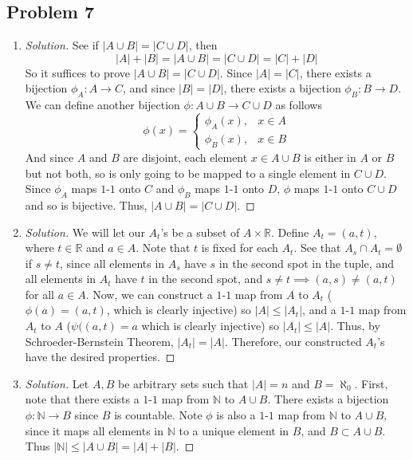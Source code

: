 \documentclass{article}
\newcommand{\N}{{\mathbb N}}
\newcommand{\R}{{\mathbb R}}
\begin{document}
\subsection*{Problem 7}
\begin{enumerate}
\item \begin{proof}[Solution]\let\qed\relax
	See if $\lvert A \cup B\rvert = \lvert C \cup D \rvert$, then
	\[
		\lvert A \rvert + \lvert B \rvert
		= \lvert A \cup B\rvert
		= \lvert C \cup D\rvert
		= \lvert C \rvert + \lvert D \rvert
	\]
	So it suffices to prove $\lvert A \cup B\rvert = \lvert C \cup D \rvert$.
	Since $|A| = |C|$, there exists a bijection $\phi_A \colon A  \to C$,
	and since $|B| = |D|$, there exists a bijection $\phi_B \colon B \to D$.
	We can define another bijection $\phi \colon A \cup B \to C \cup D$ as follows
	\[
		\phi(x) = \begin{cases} \phi_A(x), & x\in A\\ \phi_B(x), & x\in B\end{cases}
	\]
	And since $A$ and $B$ are disjoint, each element $x \in A \cup B$
	is either in $A$ or $B$ but not both,
	so is only going to be mapped to a single element in $C \cup D$.
	Since $\phi_A$ maps $1$-$1$ onto $C$ and $\phi_B$ maps $1$-$1$ onto $D$,
	$\phi$ maps $1$-$1$ onto $C \cup D$ and so is bijective.
	Thus, $\lvert A \cup B\rvert = \lvert C \cup D \rvert$.
\end{proof}
\item \begin{proof}[Solution]\let\qed\relax
	We will let our $A_t$'s be a subset of $A \times \R$.
	Define $A_t = (a, t)$, where $t\in\R$ and $a \in A$.
	Note that $t$ is fixed for each $A_t$.
	See that $A_s \cap A_t = \emptyset$ if $s \neq t$,
	since all elements in $A_s$ have $s$ in the second spot in the tuple,
	and all elements in $A_t$ have $t$ in the second spot,
	and $s \neq t \implies (a,s) \neq (a,t)$ for all $a \in A$.
	Now, we can construct a $1$-$1$ map from $A$ to $A_t$
	($\phi(a) = (a,t)$, which is clearly injective)
	so $|A| \leq |A_t|$,
	and a $1$-$1$ map from $A_t$ to $A$
	($\psi((a,t) = a$ which is clearly injective)
	so $|A_t| \leq |A|$.
	Thus, by Schroeder-Bernstein Theorem, $|A_t| = |A|$.
	Therefore, our constructed $A_t$'s have the desired properties.
\end{proof}
\item \begin{proof}[Solution]\let\qed\relax
	Let $A,B$ be arbitrary sets such that
	$|A| = n$ and $B = \aleph_0$.
	First, note that there exists a $1$-$1$ map from $\N$ to $A \cup B$.
	There exists a bijection $\phi \colon \N \to B$ since $B$ is countable.
	Note $\phi$ is also a $1$-$1$ map from $\N$ to $A\cup B$,
	since it maps all elements in $\N$ to a unique element in $B$,
	and $B \subset A \cup B$.
	Thus $|\N| \leq |A\cup B| = |A| + |B|$.
	

\end{proof}
\end{enumerate}
\end{document}
